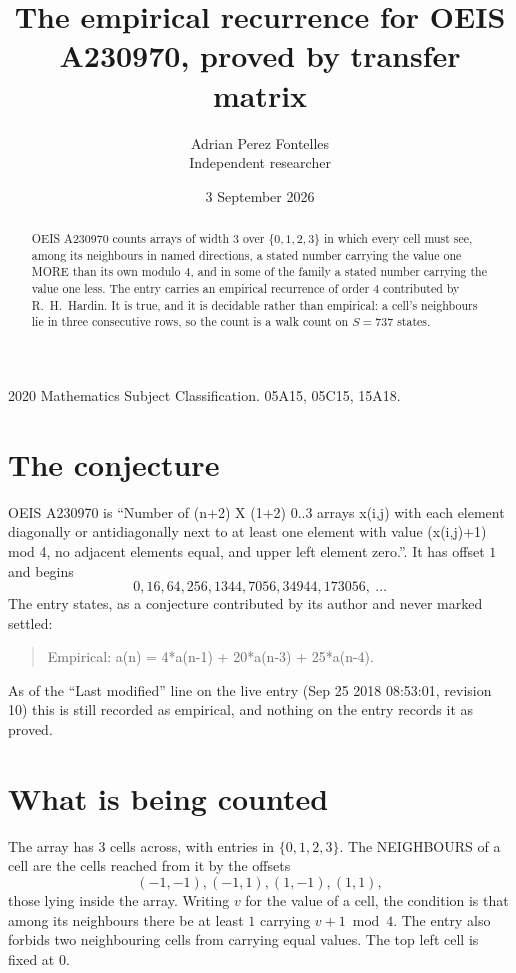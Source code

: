 \documentclass[11pt,a4paper]{article}
\title{The empirical recurrence for OEIS A230970, proved by transfer matrix}
\author{Adrian Perez Fontelles\\ \small Independent researcher}
\date{3 September 2026}
\theoremstyle{plain}
\theoremstyle{definition}
\begin{document}
\maketitle

\begin{abstract}
OEIS A230970 counts arrays of width $3$ over $\{0,1,2,3\}$ in which every cell must see, among its
neighbours in named directions, a stated number carrying the value one MORE than its own
modulo $4$, and in some of the family a stated number carrying the value one less. The entry
carries an empirical recurrence of order $4$ contributed by R.~H.~Hardin. It is true, and
it is decidable rather than empirical: a cell's neighbours lie in three consecutive rows, so
the count is a walk count on $S=737$ states.
\end{abstract}

\noindent\small 2020 Mathematics Subject Classification. 05A15, 05C15, 15A18.\normalsize

\section{The conjecture}

OEIS A230970 is ``Number of (n+2) X (1+2) 0..3 arrays x(i,j) with each element diagonally or antidiagonally next to at least one element with value (x(i,j)+1) mod 4, no adjacent elements equal, and upper left element zero.''. It has offset $1$ and begins
\[
0, 16, 64, 256, 1344, 7056, 34944, 173056,\ \dots
\]
The entry states, as a conjecture contributed by its author and never marked settled:
\begin{quote}
Empirical: a(n) = 4*a(n-1) + 20*a(n-3) + 25*a(n-4).
\end{quote}
As of the ``Last modified'' line on the live entry (Sep 25 2018 08:53:01, revision 10) this is still
recorded as empirical, and nothing on the entry records it as proved.

\section{What is being counted}

The array has $3$ cells across, with entries in $\{0,1,2,3\}$. The NEIGHBOURS of a cell are the
cells reached from it by the offsets
\[
(-1,-1), (-1,1), (1,-1), (1,1),
\]
those lying inside the array. Writing $v$ for the value of a cell, the condition is that among
its neighbours there be at least $1$ carrying $v+1 \bmod 4$. The entry also forbids two neighbouring cells from carrying equal values. The top left
cell is fixed at $0$.
\end{document}
